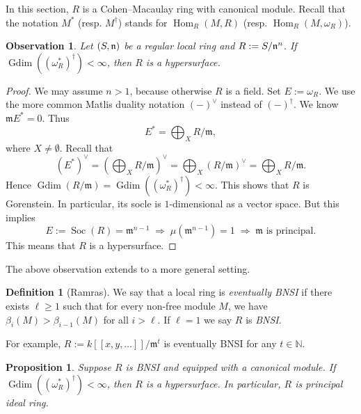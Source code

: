 \documentclass[10. pt,a4paper]{amsart}
\newtheorem{proposition}[theorem]{Proposition}
\newtheorem{observation}[theorem]{Observation}
\theoremstyle{definition}
\newtheorem{definition}[theorem]{Definition}\newcommand{\up}[1]{{{}^{#1}\!}}
\theoremstyle{remark}
\newcommand{\Hom}{\operatorname{Hom}}
\newcommand{\fn}{\frak{n}}
\begin{document}
In this section, $R$ is a Cohen--Macaulay ring with canonical module.
Recall that the notation $M^\ast$ (resp. $M^\dagger$) stands for $\Hom_R(M, R)$ (resp. $\Hom_R(M, \omega_R)$).

\begin{observation}
	Let $(S, \fn)$ be a regular local ring and $R := S / \fn^n$. If $\operatorname{Gdim}((\omega_R^\ast)^\dagger) < \infty$, then $R$ is a hypersurface.
\end{observation}

\begin{proof}
	We may assume $n > 1$, because otherwise $R$ is a field. Set $E := \omega_R$. We use the more common Matlis duality notation $(-)^{\vee}$ instead of $(-)^\dagger$. We know $\mathfrak{m} E^* = 0$. Thus
	\[
	E^* = \bigoplus_X R/\mathfrak{m},
	\]
	where $X \neq \emptyset$. Recall that
	\[
	(E^*)^{\vee} = \left( \bigoplus_X R/\mathfrak{m} \right)^{\vee} = \bigoplus_X (R/\mathfrak{m})^{\vee} = \bigoplus_X R/\mathfrak{m}.
	\]
	Hence $\operatorname{Gdim}(R/\mathfrak{m}) = \operatorname{Gdim}((\omega_R^\ast)^\dagger) < \infty$. This shows that $R$ is Gorenstein. In particular, its socle is $1$-dimensional as a vector space. But this implies
	\[
	E := \operatorname{Soc}(R) = \mathfrak{m}^{n-1} \;\Longrightarrow\; \mu(\mathfrak{m}^{n-1}) = 1 \;\Longrightarrow\; \mathfrak{m} \text{ is principal}.
	\]
	This means that $R$ is a hypersurface.
\end{proof}

The above observation extends to a more general setting.

\begin{definition}[Ramras]
	We say that a local ring is \emph{eventually BNSI} if there exists $\ell \geq 1$ such that for every non-free module $M$, we have $\beta_i(M) > \beta_{i-1}(M)$ for all $i > \ell$. 	If $\ell=1$ we say  $R$ is \emph{BNSI}.
\end{definition}

For example, $R := k[[x, y, \ldots]] / \mathfrak{m}^t$ is eventually BNSI for any $t \in \mathbb{N}$.

\begin{proposition}
	Suppose $R$ is  BNSI and equipped with a canonical module. If $\operatorname{Gdim}((\omega_R^\ast)^\dagger) < \infty$, then $R$ is a hypersurface. In particular, $R$ is  principal ideal ring. 
\end{proposition}
\end{document}
